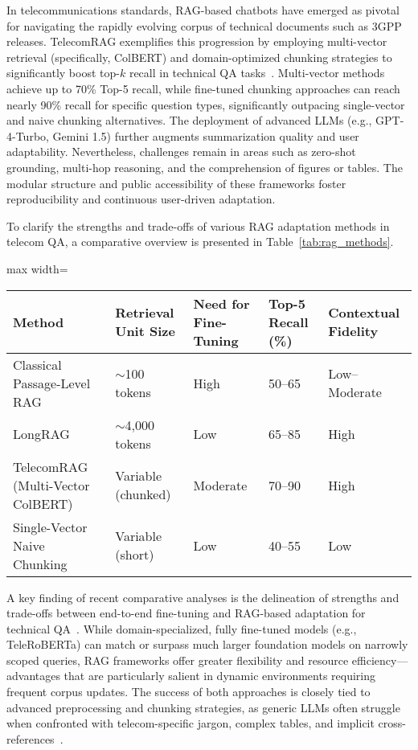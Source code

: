 \documentclass[sigconf]{acmart}
\begin{document}
In telecommunications standards, RAG-based chatbots have emerged as pivotal for navigating the rapidly evolving corpus of technical documents such as 3GPP releases. TelecomRAG exemplifies this progression by employing multi-vector retrieval (specifically, ColBERT) and domain-optimized chunking strategies to significantly boost top-\(k\) recall in technical QA tasks~\cite{ref20}. Multi-vector methods achieve up to 70\% Top-5 recall, while fine-tuned chunking approaches can reach nearly 90\% recall for specific question types, significantly outpacing single-vector and naive chunking alternatives. The deployment of advanced LLMs (e.g., GPT-4-Turbo, Gemini 1.5) further augments summarization quality and user adaptability. Nevertheless, challenges remain in areas such as zero-shot grounding, multi-hop reasoning, and the comprehension of figures or tables. The modular structure and public accessibility of these frameworks foster reproducibility and continuous user-driven adaptation.

To clarify the strengths and trade-offs of various RAG adaptation methods in telecom QA, a comparative overview is presented in Table~\ref{tab:rag_methods}.

\begin{table*}[htbp]
\centering
\caption{Comparative Properties of RAG Adaptation Strategies in Telecom Question Answering}
\label{tab:rag_methods}
\begin{adjustbox}{max width=\textwidth}
\begin{tabular}{lllll}
\toprule
\textbf{Method} & \textbf{Retrieval Unit Size} & \textbf{Need for Fine-Tuning} & \textbf{Top-5 Recall (\%)} & \textbf{Contextual Fidelity} \\
\midrule
Classical Passage-Level RAG & \(\sim\)100 tokens & High & 50--65 & Low--Moderate \\
LongRAG & \(\sim\)4,000 tokens & Low & 65--85 & High \\
TelecomRAG (Multi-Vector ColBERT) & Variable (chunked) & Moderate & 70--90 & High \\
Single-Vector Naive Chunking & Variable (short) & Low & 40--55 & Low \\
\bottomrule
\end{tabular}
\end{adjustbox}
\end{table*}

A key finding of recent comparative analyses is the delineation of strengths and trade-offs between end-to-end fine-tuning and RAG-based adaptation for technical QA~\cite{ref22,ref26}. While domain-specialized, fully fine-tuned models (e.g., TeleRoBERTa) can match or surpass much larger foundation models on narrowly scoped queries, RAG frameworks offer greater flexibility and resource efficiency---advantages that are particularly salient in dynamic environments requiring frequent corpus updates. The success of both approaches is closely tied to advanced preprocessing and chunking strategies, as generic LLMs often struggle when confronted with telecom-specific jargon, complex tables, and implicit cross-references~\cite{ref22}.
\end{document}
